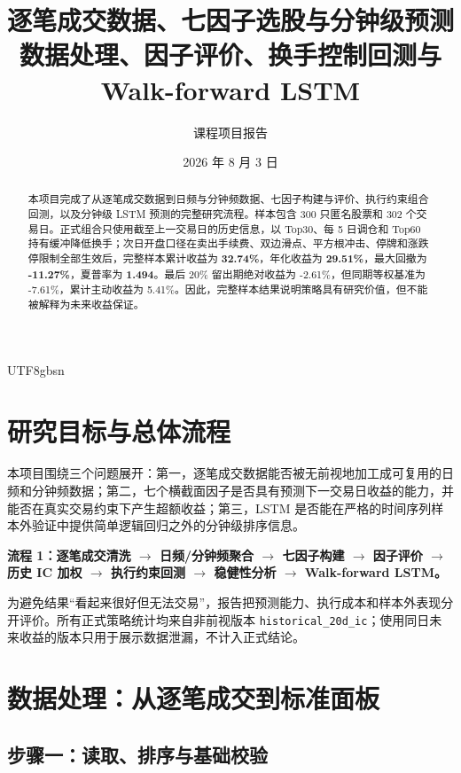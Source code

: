 \documentclass[a4paper,11pt,openany]{report}
\title{\textbf{逐笔成交数据、七因子选股与分钟级预测}\\[0.4em]
\large 数据处理、因子评价、换手控制回测与 Walk-forward LSTM}
\author{课程项目报告}
\date{2026 年 8 月 3 日}
\newcommand{\code}[1]{\texttt{#1}}
\newcommand{\stepbox}[1]{%
  \begin{center}
  \colorbox{atlaslight}{\parbox{0.93\textwidth}{\textbf{#1}}}
  \end{center}}
\begin{document}
\begin{CJK*}{UTF8}{gbsn}
\renewcommand{\contentsname}{目录}
\renewcommand{\abstractname}{摘要}
\renewcommand{\figurename}{图}
\renewcommand{\tablename}{表}

\maketitle

\begin{abstract}
本项目完成了从逐笔成交数据到日频与分钟频数据、七因子构建与评价、执行约束组合回测，以及分钟级 LSTM 预测的完整研究流程。样本包含 300 只匿名股票和 302 个交易日。正式组合只使用截至上一交易日的历史信息，以 Top30、每 5 日调仓和 Top60 持有缓冲降低换手；次日开盘口径在卖出手续费、双边滑点、平方根冲击、停牌和涨跌停限制全部生效后，完整样本累计收益为 \textbf{32.74\%}，年化收益为 \textbf{29.51\%}，最大回撤为 \textbf{-11.27\%}，夏普率为 \textbf{1.494}。最后 20\% 留出期绝对收益为 -2.61\%，但同期等权基准为 -7.61\%，累计主动收益为 5.41\%。因此，完整样本结果说明策略具有研究价值，但不能被解释为未来收益保证。
\end{abstract}

\tableofcontents
\clearpage

\chapter{研究目标与总体流程}

本项目围绕三个问题展开：第一，逐笔成交数据能否被无前视地加工成可复用的日频和分钟频数据；第二，七个横截面因子是否具有预测下一交易日收益的能力，并能否在真实交易约束下产生超额收益；第三，LSTM 是否能在严格的时间序列样本外验证中提供简单逻辑回归之外的分钟级排序信息。

\stepbox{流程 1：逐笔成交清洗 $\rightarrow$ 日频/分钟频聚合 $\rightarrow$ 七因子构建 $\rightarrow$ 因子评价 $\rightarrow$ 历史 IC 加权 $\rightarrow$ 执行约束回测 $\rightarrow$ 稳健性分析 $\rightarrow$ Walk-forward LSTM。}

为避免结果“看起来很好但无法交易”，报告把预测能力、执行成本和样本外表现分开评价。所有正式策略统计均来自非前视版本 \code{historical\_20d\_ic}；使用同日未来收益的版本只用于展示数据泄漏，不计入正式结论。

\chapter{数据处理：从逐笔成交到标准面板}

\section{步骤一：读取、排序与基础校验}


\end{CJK*}
\end{document}
